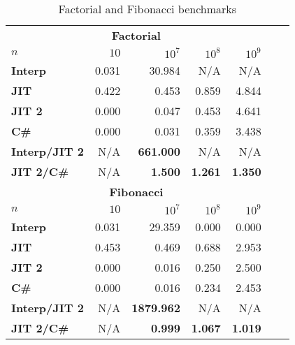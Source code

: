 \begin{table}[ht]
  \begin{center}

  \begin{tabular}{l|rrrrrr}
    \multicolumn{5}{c}{\textbf{Factorial}} \\ [0.5ex]

    \textbf{$n$}          & $10$  & $10^7$           & $10^8$         & $10^9$         \\
    \hline
    \textbf{Interp}       & 0.031 & 30.984           & N/A            & N/A            \\
    \textbf{JIT}          & 0.422 &  0.453           & 0.859          & 4.844          \\
    \textbf{JIT 2}        & 0.000 &  0.047           & 0.453          & 4.641          \\
    \textbf{C\#}          & 0.000 &  0.031           & 0.359          & 3.438          \\
    \textbf{Interp/JIT 2} & N/A   & \textbf{661.000} & N/A            & N/A            \\
    \textbf{JIT 2/C\#}    & N/A   & \textbf{1.500}   & \textbf{1.261} & \textbf{1.350} \\ [3ex]


    \multicolumn{5}{c}{\textbf{Fibonacci}} \\ [0.5ex]

    \textbf{$n$}          & $10$  & $10^7$           & $10^8$         & $10^9$         \\
    \hline
    \textbf{Interp}       & 0.031 & 29.359           & 0.000          & 0.000          \\
    \textbf{JIT}          & 0.453 &  0.469           & 0.688          & 2.953          \\
    \textbf{JIT 2}        & 0.000 &  0.016           & 0.250          & 2.500          \\ 
    \textbf{C\#}          & 0.000 &  0.016           & 0.234          & 2.453          \\
    \textbf{Interp/JIT 2} & N/A   & \textbf{1879.962}& N/A            & N/A            \\
    \textbf{JIT 2/C\#}    & N/A   & \textbf{0.999}   & \textbf{1.067} & \textbf{1.019} \\
  \end{tabular}

  \end{center}
  \caption{Factorial and Fibonacci benchmarks}
  \label{tab:factorial-fibo}
\end{table}


